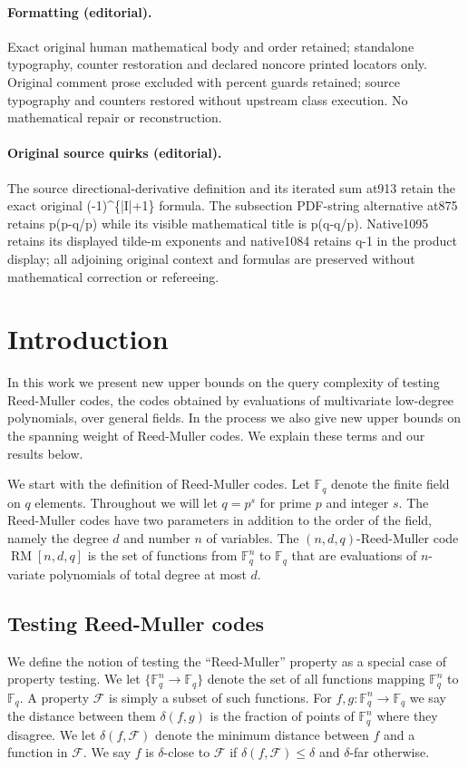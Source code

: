 \documentclass[10pt]{article}
\theoremstyle{definition}
\numberwithin{equation}{section}
\newcommand{\F}{{\mathbb{F}}}
\newcommand{\cF}{{\mathcal{F}}}
\newcommand{\mrm}{\mathop{\mathrm{RM}}}
\begin{document}
\paragraph{Formatting (editorial).} Exact original human mathematical body and order retained; standalone typography, counter restoration and declared noncore printed locators only. Original comment prose excluded with percent guards retained; source typography and counters restored without upstream class execution. No mathematical repair or reconstruction.
\paragraph{Original source quirks (editorial).} The source directional-derivative definition and its iterated sum at913 retain the exact original (-1)\textasciicircum{}\{|I|+1\} formula. The subsection PDF-string alternative at875 retains p(p-q/p) while its visible mathematical title is p(q-q/p). Native1095 retains its displayed tilde-m exponents and native1084 retains q-1 in the product display; all adjoining original context and formulas are preserved without mathematical correction or refereeing.
\endgroup
\clearpage
\setcounter{section}{0}
\section{Introduction}

In this work we present new upper bounds on the query complexity of testing
Reed-Muller codes, the codes obtained by evaluations of multivariate 
low-degree polynomials, over general fields. In the process we also 
give new upper
bounds on the spanning weight of Reed-Muller codes. We explain
these terms and our results below.

We start with the definition of Reed-Muller codes. Let $\F_q$ denote
the finite field on $q$ elements. Throughout we will let $q = p^s$ for
prime $p$ and integer $s$. The Reed-Muller codes have two parameters
in addition to the 
%
order of the field,   %
namely the degree $d$ and 
%
number $n$ of variables.  %
The $(n,d,q)$-Reed-Muller code $\mrm[n,d,q]$ is the
set of functions from $\F_q^n$ to $\F_q$ that are evaluations of
$n$-variate polynomials of total degree at most $d$.

\subsection{Testing Reed-Muller codes}

We define the notion of testing the ``Reed-Muller'' property as
a special case of property testing.
We let $\{\F_q^n \to \F_q\}$ denote the set of all functions
mapping $\F_q^n$ to $\F_q$. A property $\cF$ is simply a subset
of such functions. For $f,g : \F_q^n \to \F_q$ we say
the distance between them $\delta(f,g)$ is the fraction of
points of $\F_q^n$ where they disagree.
We let $\delta(f,\cF)$ denote the minimum distance between $f$ and
a function in $\cF$. We say $f$ is $\delta$-close
to $\cF$ if $\delta(f,\cF)\leq \delta$
and $\delta$-far otherwise.
\end{document}
